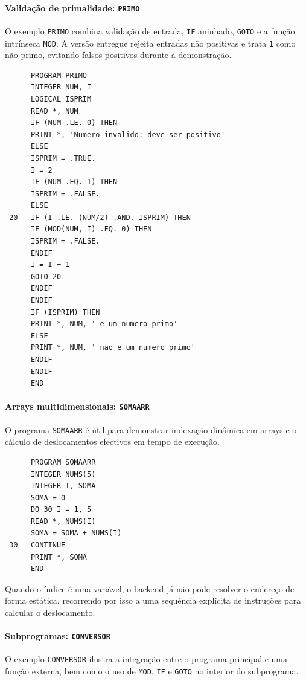 \documentclass{article}
\begin{document}
\paragraph{Validação de primalidade: \texttt{PRIMO}}
O exemplo \texttt{PRIMO} combina validação de entrada, \texttt{IF} aninhado, \texttt{GOTO}
e a função intrínseca \texttt{MOD}. A versão entregue rejeita entradas não positivas e trata
\texttt{1} como não primo, evitando falsos positivos durante a demonstração.

\begin{verbatim}
      PROGRAM PRIMO
      INTEGER NUM, I
      LOGICAL ISPRIM
      READ *, NUM
      IF (NUM .LE. 0) THEN
      PRINT *, 'Numero invalido: deve ser positivo'
      ELSE
      ISPRIM = .TRUE.
      I = 2
      IF (NUM .EQ. 1) THEN
      ISPRIM = .FALSE.
      ELSE
 20   IF (I .LE. (NUM/2) .AND. ISPRIM) THEN
      IF (MOD(NUM, I) .EQ. 0) THEN
      ISPRIM = .FALSE.
      ENDIF
      I = I + 1
      GOTO 20
      ENDIF
      ENDIF
      IF (ISPRIM) THEN
      PRINT *, NUM, ' e um numero primo'
      ELSE
      PRINT *, NUM, ' nao e um numero primo'
      ENDIF
      ENDIF
      END
\end{verbatim}

\paragraph{Arrays multidimensionais: \texttt{SOMAARR}}
O programa \texttt{SOMAARR} é útil para demonstrar indexação dinâmica em arrays e o cálculo de
deslocamentos efectivos em tempo de execução.

\begin{verbatim}
      PROGRAM SOMAARR
      INTEGER NUMS(5)
      INTEGER I, SOMA
      SOMA = 0
      DO 30 I = 1, 5
      READ *, NUMS(I)
      SOMA = SOMA + NUMS(I)
 30   CONTINUE
      PRINT *, SOMA
      END
\end{verbatim}

Quando o índice é uma variável, o backend já não pode resolver o endereço de forma estática,
recorrendo por isso a uma sequência explícita de instruções para calcular o deslocamento.

\paragraph{Subprogramas: \texttt{CONVERSOR}}
O exemplo \texttt{CONVERSOR} ilustra a integração entre o programa principal e uma função
externa, bem como o uso de \texttt{MOD}, \texttt{IF} e \texttt{GOTO} no interior do subprograma.
\end{document}
